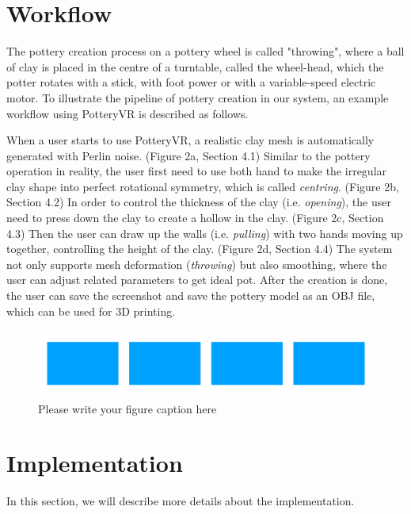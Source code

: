 \section{Workflow}
\label{sec:3}

The pottery creation process on a pottery wheel is called "throwing", where a ball of clay is placed in the centre of a turntable, called the wheel-head, which the potter rotates with a stick, with foot power or with a variable-speed electric motor.
To illustrate the pipeline of pottery creation in our system, an example workflow using PotteryVR is described as follows.

When a user starts to use PotteryVR, a realistic clay mesh is automatically generated with Perlin noise. (Figure 2a, Section 4.1)
Similar to the pottery operation in reality, the user first need to use both hand to make the irregular clay shape into perfect rotational symmetry, which is called \textit{centring}. (Figure 2b, Section 4.2)
In order to control the thickness of the clay (i.e. \textit{opening}), the user need to press down the clay to create a hollow in the clay. (Figure 2c, Section 4.3)
Then the user can draw up the walls (i.e. \textit{pulling}) with two hands moving up together, controlling the height of the clay. (Figure 2d, Section 4.4)
The system not only supports mesh deformation (\textit{throwing}) but also smoothing, where the user can adjust related parameters to get ideal pot.
After the creation is done, the user can save the screenshot and save the pottery model as an OBJ file, which can be used for 3D printing.
\begin{figure}
  \includegraphics[width=\textwidth]{t2.pdf}
\caption{Please write your figure caption here}
\label{fig:1}       %
\end{figure}


\section{Implementation}
\label{sec:4}

In this section, we will describe more details about the implementation. 



